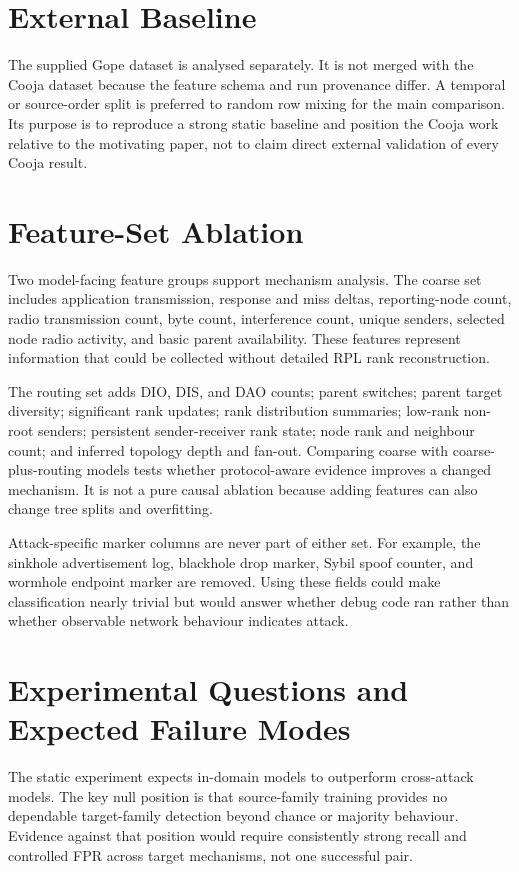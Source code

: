 \section{External Baseline}

The supplied Gope dataset is analysed separately. It is not merged with the Cooja dataset because the feature schema and run provenance differ. A temporal or source-order split is preferred to random row mixing for the main comparison. Its purpose is to reproduce a strong static baseline and position the Cooja work relative to the motivating paper, not to claim direct external validation of every Cooja result.

\section{Feature-Set Ablation}

Two model-facing feature groups support mechanism analysis. The coarse set includes application transmission, response and miss deltas, reporting-node count, radio transmission count, byte count, interference count, unique senders, selected node radio activity, and basic parent availability. These features represent information that could be collected without detailed RPL rank reconstruction.

The routing set adds DIO, DIS, and DAO counts; parent switches; parent target diversity; significant rank updates; rank distribution summaries; low-rank non-root senders; persistent sender-receiver rank state; node rank and neighbour count; and inferred topology depth and fan-out. Comparing coarse with coarse-plus-routing models tests whether protocol-aware evidence improves a changed mechanism. It is not a pure causal ablation because adding features can also change tree splits and overfitting.

Attack-specific marker columns are never part of either set. For example, the sinkhole advertisement log, blackhole drop marker, Sybil spoof counter, and wormhole endpoint marker are removed. Using these fields could make classification nearly trivial but would answer whether debug code ran rather than whether observable network behaviour indicates attack.

\section{Experimental Questions and Expected Failure Modes}

The static experiment expects in-domain models to outperform cross-attack models. The key null position is that source-family training provides no dependable target-family detection beyond chance or majority behaviour. Evidence against that position would require consistently strong recall and controlled FPR across target mechanisms, not one successful pair.

